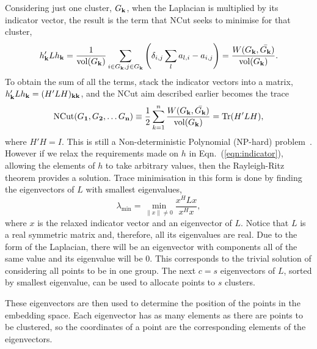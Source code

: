 Considering just one cluster, \(G_{\textbf{k}}\), when the Laplacian is multiplied by its indicator vector,
the result is the term that NCut seeks to minimise for that cluster,
\begin{equation}
    h_{\textbf{k}}'Lh_{\textbf{k}} = \frac{1}{\text{vol}(G_{\textbf{k}})}\sum_{i \in G_{\textbf{k}}, j \in G_{\textbf{k}}} \left(\delta_{i, j}\sum_{l} a_{l, i} - a_{i, j} \right) = \frac{W(G_{\textbf{k}}, \bar{G_{\textbf{k}}})}{\text{vol}(G_{\textbf{k}})}.
\end{equation}
To obtain the sum of all the terms, stack the indicator vectors into a matrix,
\( h'_{\textbf{k}} L h_{\textbf{k}} = (H'L H)_{\textbf{k}\textbf{k}}\),
and the NCut aim described earlier becomes the trace
\begin{equation} \text{NCut}(G_{\textbf{1}},G_{\textbf{2}}, \dots G_{\textbf{n}}) \equiv \frac{1}{2} \sum_{k=1}^n \frac{W(G_{\textbf{k}}, \bar{G_{\textbf{k}}})}{\text{vol}(G_{\textbf{k}})} = \text{Tr}(H'LH),\end{equation}
where \(H'H = I\).
This is still a Non-deterministic Polynomial (NP-hard) problem~\cite{Leeuwen:1990_unfound0}.
However if we relax the requirements made on \(h\) in Eqn.~(\ref{eqn:indicator}),
allowing the elements of \(h\) to take arbitrary values, then the Rayleigh-Ritz theorem provides a solution.
Trace minimisation in this form is done by finding the eigenvectors of \(L\) with smallest eigenvalues,
\begin{equation}
    \lambda_\text{min} = \min_{\|x\|\ne 0 } \frac{x^H L x}{x^H x},
\end{equation}
where \(x\) is the relaxed indicator vector and an eigenvector of \(L\).
Notice that \(L\) is a real symmetric matrix
and, therefore, all its eigenvalues are real.
Due to the form of the Laplacian, there will be an eigenvector with components all of the same value and its eigenvalue will be \(0\).
This corresponds to the trivial solution of considering all points to be in one group.
The next \(c=s\) eigenvectors of \(L\), sorted by smallest eigenvalue, can be used to allocate points to \(s\) clusters.

These eigenvectors are then used to determine the position of the points in the embedding space.
Each eigenvector has as many elements as there are points to be clustered,
so the coordinates of a point are the corresponding elements of the eigenvectors.

